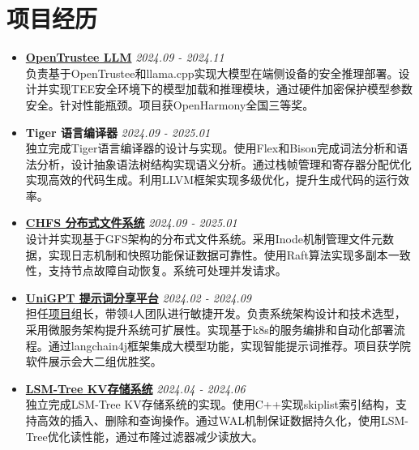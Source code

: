 \documentclass[a4paper]{article}
\begin{document}
\section*{项目经历}
\begin{itemize}[leftmargin=*,label={},itemsep=0.5em,topsep=0.2em]
\item \textbf{\href{https://gitee.com/qiweic10/open-trustee_-llm_app}{OpenTrustee LLM}} \hfill \textit{2024.09 - 2024.11}\\
负责基于OpenTrustee和llama.cpp实现大模型在端侧设备的安全推理部署。设计并实现TEE安全环境下的模型加载和推理模块，通过硬件加密保护模型参数安全。针对性能瓶颈。项目获OpenHarmony全国三等奖。

\item \textbf{Tiger 语言编译器} \hfill \textit{2024.09 - 2025.01}\\
独立完成Tiger语言编译器的设计与实现。使用Flex和Bison完成词法分析和语法分析，设计抽象语法树结构实现语义分析。通过栈帧管理和寄存器分配优化实现高效的代码生成。利用LLVM框架实现多级优化，提升生成代码的运行效率。

\item \textbf{\href{https://github.com/kiwi142857/CSE-chfs}{CHFS 分布式文件系统}} \hfill \textit{2024.09 - 2025.01}\\
设计并实现基于GFS架构的分布式文件系统。采用Inode机制管理文件元数据，实现日志机制和快照功能保证数据可靠性。使用Raft算法实现多副本一致性，支持节点故障自动恢复。系统可处理并发请求。

\item \textbf{\href{https://base.sjtu.edu.cn/se/Awards.html}{UniGPT 提示词分享平台}} \hfill \textit{2024.02 - 2024.09}\\
担任{\href{https://github.com/UniGPT-SJTU}{项目}}组长，带领4人团队进行敏捷开发。负责系统架构设计和技术选型，采用微服务架构提升系统可扩展性。实现基于k8s的服务编排和自动化部署流程。通过langchain4j框架集成大模型功能，实现智能提示词推荐。项目获学院软件展示会大二组优胜奖。

\item \textbf{\href{https://github.com/kiwi142857/LSM-Tree}{LSM-Tree KV存储系统}} \hfill \textit{2024.04 - 2024.06}\\
独立完成LSM-Tree KV存储系统的实现。使用C++实现skiplist索引结构，支持高效的插入、删除和查询操作。通过WAL机制保证数据持久化，使用LSM-Tree优化读性能，通过布隆过滤器减少读放大。
\end{itemize}
\end{document}
